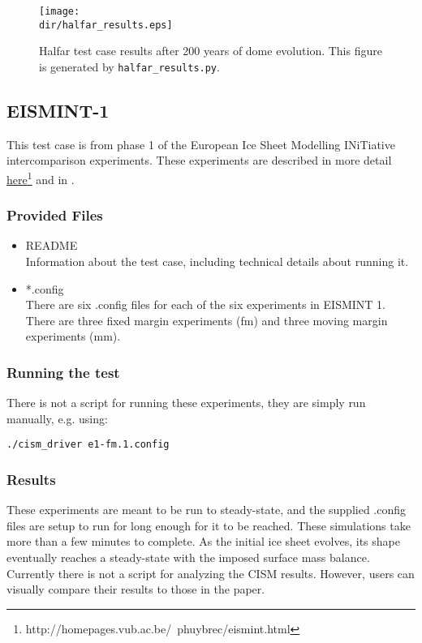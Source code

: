 \begin{figure}[H]
	\centering
	\texttt{[image: \\dir/halfar\_results.eps]}
	\caption{Halfar test case results after 200 years of dome evolution. This figure is generated by \texttt{halfar\_results.py}.}
	\label{fig:halfarresults}
\end{figure}


\FloatBarrier


\subsection{EISMINT-1}
\label{sec:eismint_description}
This test case is from phase 1 of the European Ice Sheet Modelling INiTiative intercomparison experiments.  These experiments are described in more detail
\href{http://homepages.vub.ac.be/~phuybrec/eismint.html}{here}\footnote{http://homepages.vub.ac.be/~phuybrec/eismint.html} and in \citet{Huybrechts1996}.

\subsubsection{Provided Files}
\label{subsec:eismint_files}

\begin{itemize}
	\item README \\
	Information about the test case, including technical details about running it.
	\item *.config \\
  	There are six .config files for each of the six experiments in EISMINT 1.  There are three fixed margin experiments (fm) and three moving margin experiments (mm).
\end{itemize}

\subsubsection{Running the test}
There is not a script for running these experiments, they are simply run manually, e.g. using: 

\texttt{./cism\_driver e1-fm.1.config}

\subsubsection{Results}
\label{subsecc:eismint_results}
These experiments are meant to be run to steady-state, and the supplied .config files are setup to run for long enough for it to be reached.
These simulations take more than a few minutes to complete.
As the initial ice sheet evolves, its shape eventually reaches a steady-state with the imposed surface mass balance.  Currently there is not a script for analyzing the CISM results.  However, users can visually compare their results to those in the \citet{Huybrechts1996} paper.


